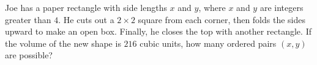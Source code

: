 Joe has a paper rectangle with side lengths $x$ and $y$, where $x$ and $y$ are integers greater than $4$. He cuts out a $2\times2$ square from each corner, then folds the sides upward to make an open box. Finally, he closes the top with another rectangle. If the volume of the new shape is $216$ cubic units, how many ordered pairs $(x,y)$ are possible?
